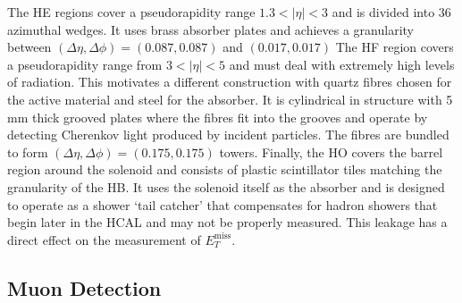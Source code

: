 The HE regions cover a pseudorapidity range $1.3<|\eta|<3$ and is divided into 36 azimuthal wedges. It uses brass absorber plates and achieves a granularity between $(\Delta\eta,\Delta\phi) = (0.087,0.087)$ and $(0.017,0.017)$
The HF region covers a pseudorapidity range from $3<|\eta|<5$ and must deal with extremely high levels of radiation. This motivates a different construction with quartz fibres chosen for the active material and steel for the absorber. It is cylindrical in structure with 5\,mm thick grooved plates where the fibres fit into the grooves and operate by detecting Cherenkov light produced by incident particles. The fibres are bundled to form $(\Delta\eta,\Delta\phi) = (0.175,0.175)$ towers.
Finally, the HO covers the barrel region around the solenoid and consists of plastic scintillator tiles matching the granularity of the HB. It uses the solenoid itself as the absorber and is designed to operate as a shower `tail catcher' that compensates for hadron showers that begin later in the HCAL and may not be properly measured. This leakage has a direct effect on the measurement of $E_{T}^{\mathrm{miss}}$.



\subsection{Muon Detection}

